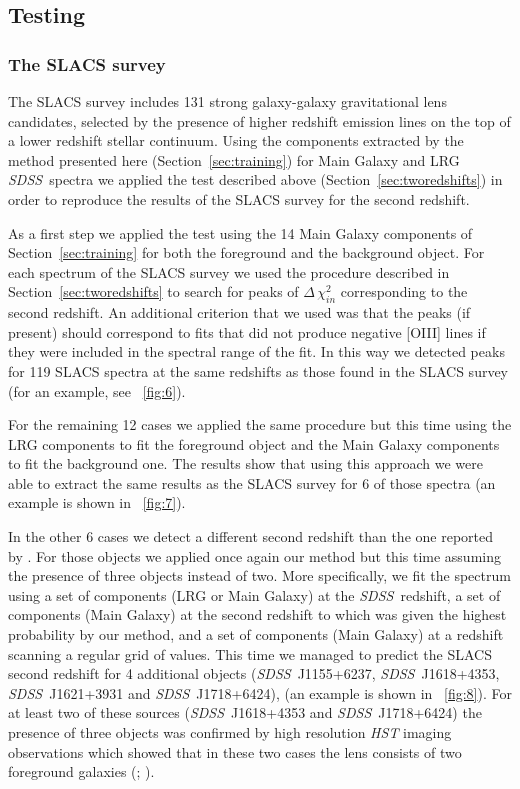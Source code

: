 \documentclass[12pt,preprint]{aastex}
\newcommand{\project}[1]{\textsl{#1}}
\newcommand{\sdss}{\project{SDSS}}
\newcommand{\SDSS}{\sdss}
\newcommand{\sectionname}{Section}
\begin{document}
\subsection{Testing}

\subsubsection{The SLACS survey}
The SLACS survey \citep{bolton} includes 131 strong galaxy-galaxy
gravitational lens candidates, selected by the presence of higher
redshift emission lines on the top of a lower redshift stellar continuum. 
Using the components extracted by the method presented here
(\sectionname~\ref{sec:training}) for Main Galaxy and LRG \SDSS\ spectra
we applied the test described above
(\sectionname~\ref{sec:tworedshifts}) in order to reproduce the results of the
SLACS survey for the second redshift.

As a first step we applied the test using the 14 Main Galaxy components of
\sectionname~\ref{sec:training} for both the foreground and the
background object. For each spectrum of the SLACS survey we used 
the procedure described in \sectionname~\ref{sec:tworedshifts} to
search for peaks of $\Delta\,\chi_{in}^2$ corresponding to the second redshift. 
An additional criterion that we used was that the peaks (if present) should 
correspond to fits that did not produce negative [OIII] lines if they were 
included in the spectral range of the fit. In this way we detected peaks for 119 SLACS 
spectra at the same redshifts as those found in the SLACS survey 
(for an example, see \figurename~\ref{fig:6}).

For the remaining 12 cases we applied the same procedure but this
time using the LRG components to fit the foreground object and the
Main Galaxy components to fit the background one. The results show that
using this approach we were able to extract the same results as the SLACS
survey for 6 of those spectra (an example is shown in \figurename~\ref{fig:7}).

In the other 6 cases we detect a different second redshift than
the one reported by \cite{bolton}. For those objects we applied once
again our method but this time assuming the presence of three objects
instead of two. More specifically, we fit the spectrum using a set of
components (LRG or Main Galaxy) at the \SDSS\ redshift, a set of components
(Main Galaxy) at the second redshift to which was given the highest
probability by our method, and a set of components (Main Galaxy)
at a redshift scanning a regular grid of values. This time we managed
to predict the SLACS second redshift for 4 additional objects (\SDSS\ J1155+6237, 
\SDSS\ J1618+4353, \SDSS\ J1621+3931 and \SDSS\ J1718+6424),
(an example is shown in \figurename~\ref{fig:8}). For at least two of these 
sources (\SDSS\ J1618+4353 and \SDSS\ J1718+6424) the presence of three objects 
was confirmed by high resolution \project{HST} imaging observations which showed that in these 
two cases the lens consists of two foreground galaxies (\citealt{bolton06}; \citealt{bolton}).
\end{document}
